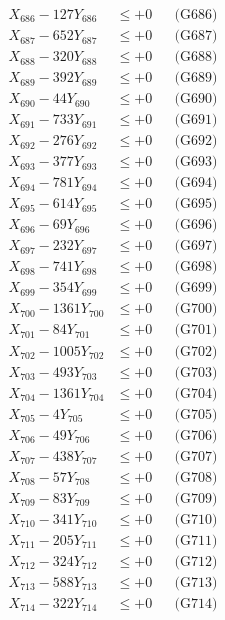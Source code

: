 \documentclass[a4paper,10pt]{article}
\begin{document}
{\begin{align}
X_{686} - 127Y_{686} &\leq +0 && \text{(G686)} \\
X_{687} - 652Y_{687} &\leq +0 && \text{(G687)} \\
X_{688} - 320Y_{688} &\leq +0 && \text{(G688)} \\
X_{689} - 392Y_{689} &\leq +0 && \text{(G689)} \\
X_{690} - 44Y_{690} &\leq +0 && \text{(G690)} \\
\allowbreak
X_{691} - 733Y_{691} &\leq +0 && \text{(G691)} \\
X_{692} - 276Y_{692} &\leq +0 && \text{(G692)} \\
X_{693} - 377Y_{693} &\leq +0 && \text{(G693)} \\
X_{694} - 781Y_{694} &\leq +0 && \text{(G694)} \\
X_{695} - 614Y_{695} &\leq +0 && \text{(G695)} \\
X_{696} - 69Y_{696} &\leq +0 && \text{(G696)} \\
X_{697} - 232Y_{697} &\leq +0 && \text{(G697)} \\
X_{698} - 741Y_{698} &\leq +0 && \text{(G698)} \\
X_{699} - 354Y_{699} &\leq +0 && \text{(G699)} \\
X_{700} - 1361Y_{700} &\leq +0 && \text{(G700)} \\
\allowbreak
X_{701} - 84Y_{701} &\leq +0 && \text{(G701)} \\
X_{702} - 1005Y_{702} &\leq +0 && \text{(G702)} \\
X_{703} - 493Y_{703} &\leq +0 && \text{(G703)} \\
X_{704} - 1361Y_{704} &\leq +0 && \text{(G704)} \\
X_{705} - 4Y_{705} &\leq +0 && \text{(G705)} \\
X_{706} - 49Y_{706} &\leq +0 && \text{(G706)} \\
X_{707} - 438Y_{707} &\leq +0 && \text{(G707)} \\
X_{708} - 57Y_{708} &\leq +0 && \text{(G708)} \\
X_{709} - 83Y_{709} &\leq +0 && \text{(G709)} \\
X_{710} - 341Y_{710} &\leq +0 && \text{(G710)} \\
\allowbreak
X_{711} - 205Y_{711} &\leq +0 && \text{(G711)} \\
X_{712} - 324Y_{712} &\leq +0 && \text{(G712)} \\
X_{713} - 588Y_{713} &\leq +0 && \text{(G713)} \\
X_{714} - 322Y_{714} &\leq +0 && \text{(G714)} \\

\end{align}}
\end{document}
